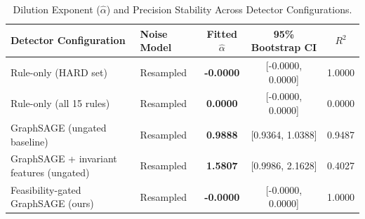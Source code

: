 \begin{table}[t]
\centering
\caption{Dilution Exponent ($\hat{\alpha}$) and Precision Stability Across Detector Configurations.}
\label{tab:ablation_dilution}
\begin{tabular}{llccc}
\toprule
\textbf{Detector Configuration} & \textbf{Noise Model} & \textbf{Fitted $\hat{\alpha}$} & \textbf{95\% Bootstrap CI} & \textbf{$R^2$} \\
\midrule
Rule-only (HARD set) & Resampled & \textbf{-0.0000} & [-0.0000, 0.0000] & 1.0000 \\
Rule-only (all 15 rules) & Resampled & \textbf{0.0000} & [-0.0000, 0.0000] & 0.0000 \\
GraphSAGE (ungated baseline) & Resampled & \textbf{0.9888} & [0.9364, 1.0388] & 0.9487 \\
GraphSAGE + invariant features (ungated) & Resampled & \textbf{1.5807} & [0.9986, 2.1628] & 0.4027 \\
Feasibility-gated GraphSAGE (ours) & Resampled & \textbf{-0.0000} & [-0.0000, 0.0000] & 1.0000 \\
\bottomrule
\end{tabular}
\end{table}
